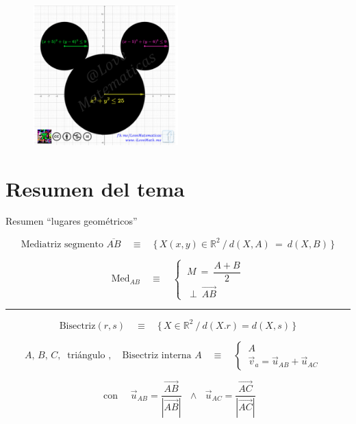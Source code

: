 \begin{figure}[H]
	\centering
	\includegraphics[width=0.5\textwidth]{img-lg/lg08.png}
\end{figure}




\newpage
\vspace{1cm}
\section{Resumen del tema}
\vspace{0.5cm}

\begin{myblock}{Resumen ``lugares geométricos''}

$$\text{Mediatriz segmento } \overline{AB} \quad \equiv \quad \{ \, X(x,y)\in \mathbb R^2\ \big/ \ d(X,A) \ = \ d(X,B) \, \}$$

\vspace{5mm} $$\text{Med}_{AB} \quad \equiv \quad \begin{cases} \ M\ = \ \dfrac{A+B}{2} \\  \ \perp \ \overrightarrow{AB} \end{cases}$$ 

\vspace{5mm}
\begin{center} \rule{200pt}{0.1pt}  \end{center}


\vspace{5mm}$$\text{Bisectriz}(r,s) \quad \equiv \quad  \{ \, X\in \mathbb R^2 \ \big/ \ d(X.r)=d(X,s) \, \}$$

\vspace{5mm} $$A,\, B,\, C,\ \text{ triángulo } , \quad \text{Bisectriz interna } A \quad \equiv \quad \begin{cases} \ A \\ \ \vec v_a=\vec u_{AB}+\vec u_{AC} \end{cases} \quad $$

$$\text{ con } \quad \vec u_{AB}=\dfrac{\overrightarrow{AB}}{|\overrightarrow{AB}|} \ \ \ \wedge \ \ \  \vec u_{AC}=\dfrac{\overrightarrow{AC}}{|\overrightarrow{AC}|} $$

	
\end{myblock}



